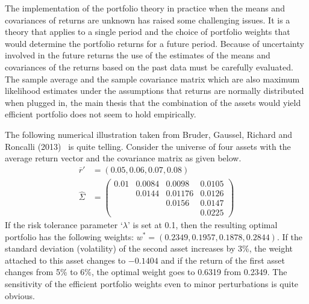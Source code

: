 The implementation of the portfolio theory in practice when the means and covariances of returns are unknown has raised some challenging issues. It is a theory that applies to a single period and the choice of portfolio weights that would determine the portfolio returns for a future period. Because of uncertainty involved in the future returns the use of the estimates of the means and covariances of the returns based on the past data must be carefully evaluated. The sample average and the sample covariance matrix which are also maximum likelihood estimates under the assumptions that returns are normally distributed when plugged in, the main thesis that the combination of the assets would yield efficient portfolio does not seem to hold empirically. 


The following numerical illustration taken from Bruder, Gaussel, Richard and Roncalli (2013)~\cite{bruder} is quite telling. Consider the universe of four assets with the average return vector and the covariance matrix as given below.
	\begin{equation}\label{eqn:ovrsighat}
	\begin{split}
	\overline{r}'&= (0.05, 0.06, 0.07, 0.08) \\
	\hat{\Sigma}&=\begin{pmatrix}
	0.01 & 0.0084 & 0.0098 & 0.0105 \\
	        & 0.0144 & 0.01176 & 0.0126 \\
	        &             & 0.0156 & 0.0147 \\
	        &             &             & 0.0225
	\end{pmatrix}
	\end{split}
	\end{equation}
If the risk tolerance parameter `$\lambda$' is set at 0.1, then the resulting optimal portfolio has the following weights: $w^*=(0.2349, 0.1957, 0.1878, 0.2844)$. If the standard deviation (volatility) of the second asset increases by 3\%, the weight attached to this asset changes to $-0.1404$ and if the return of the first asset changes from 5\% to 6\%, the optimal weight goes to 0.6319 from 0.2349. The sensitivity of the efficient portfolio weights even to minor perturbations is quite obvious. 



